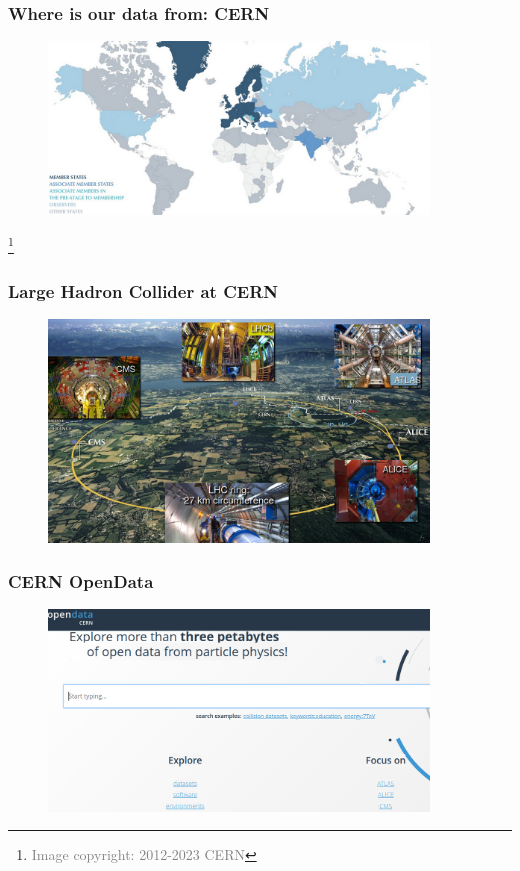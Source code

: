 \documentclass[11pt,xcolor=dvipsnames,aspectratio=169]{beamer}
\newcommand\blfootnote[1]{%
  \begingroup
  \renewcommand\thefootnote{}\footnote{\hspace{-30pt}\textcolor{Gray}{\tiny #1}}%
  \addtocounter{footnote}{-1}%
  \endgroup
}
\begin{document}
\begin{frame}
  \frametitle{\bf Where is our data from: CERN}
  \vspace{-5pt}
      \begin{figure}
        \includegraphics[width=0.90\textwidth]{figures/l3/cern_members.png}
      \end{figure}
      \blfootnote{Image copyright: 2012-2023 CERN}
\end{frame}

\begin{frame}[fragile]
  \frametitle{\bf Large Hadron Collider at CERN}
  \vspace{-5pt}
  \begin{figure}
    \includegraphics[width=0.90\textwidth]{figures/l1/intro/lhc_snip.png}
  \end{figure}
\end{frame}

\begin{frame}[fragile]
  \frametitle{\bf CERN OpenData}
  \vspace{-5pt}
  \begin{figure}
    \includegraphics[width=0.90\textwidth]{figures/l3/opendata.png}
  \end{figure}
\end{frame}
\end{document}
